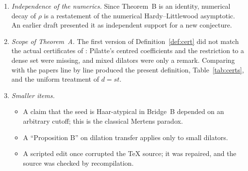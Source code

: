 \begin{enumerate}
The paper was re-centred on Theorem~A accordingly.
\item \emph{Independence of the numerics.} Since Theorem~B is an identity, numerical decay of $\rho$ is a restatement of the numerical Hardy--Littlewood asymptotic. An earlier draft presented it as independent support for a new conjecture.
\item \emph{Scope of Theorem~A.} The first version of Definition~\ref{def:cert} did not match the actual certificates of \cite{HR21,Pil23}: Pilatte's centred coefficients and the restriction to a dense set were missing, and mixed dilators were only a remark. Comparing with the papers line by line produced the present definition, Table~\ref{tab:certs}, and the uniform treatment of $d=st$.
\item \emph{Smaller items.}
\begin{itemize}
\item A claim that the seed is Haar-atypical in Bridge~B depended on an arbitrary cutoff; this is the classical Mertens paradox.
\item A ``Proposition B'' on dilation transfer applies only to small dilators.
\item A scripted edit once corrupted the \TeX{} source; it was repaired, and the source was checked by recompilation.
\end{itemize}
\end{enumerate}

